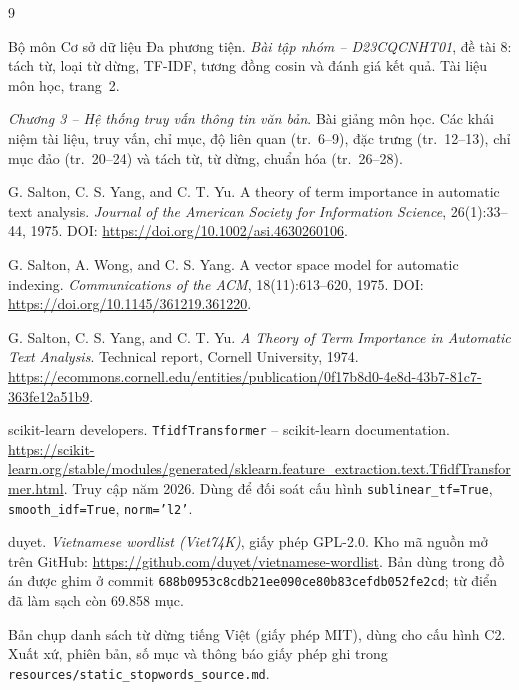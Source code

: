 \renewcommand{\bibname}{TÀI LIỆU THAM KHẢO}
\begin{thebibliography}{9}

Bộ môn Cơ sở dữ liệu Đa phương tiện.
\textit{Bài tập nhóm -- D23CQCNHT01}, đề tài 8: tách từ, loại từ dừng, TF-IDF,
tương đồng cosin và đánh giá kết quả. Tài liệu môn học, trang~2.

\textit{Chương 3 -- Hệ thống truy vấn thông tin văn bản}. Bài giảng môn học.
Các khái niệm tài liệu, truy vấn, chỉ mục, độ liên quan (tr.~6--9), đặc trưng
(tr.~12--13), chỉ mục đảo (tr.~20--24) và tách từ, từ dừng, chuẩn hóa (tr.~26--28).

G. Salton, C. S. Yang, and C. T. Yu.
\newblock A theory of term importance in automatic text analysis.
\newblock \textit{Journal of the American Society for Information Science},
26(1):33--44, 1975.
\newblock DOI: \url{https://doi.org/10.1002/asi.4630260106}.

G. Salton, A. Wong, and C. S. Yang.
\newblock A vector space model for automatic indexing.
\newblock \textit{Communications of the ACM}, 18(11):613--620, 1975.
\newblock DOI: \url{https://doi.org/10.1145/361219.361220}.

G. Salton, C. S. Yang, and C. T. Yu.
\newblock \textit{A Theory of Term Importance in Automatic Text Analysis}.
\newblock Technical report, Cornell University, 1974.
\newblock \url{https://ecommons.cornell.edu/entities/publication/0f17b8d0-4e8d-43b7-81c7-363fe12a51b9}.

scikit-learn developers.
\newblock \texttt{TfidfTransformer} -- scikit-learn documentation.
\newblock \url{https://scikit-learn.org/stable/modules/generated/sklearn.feature_extraction.text.TfidfTransformer.html}.
\newblock Truy cập năm 2026. Dùng để đối soát cấu hình
\texttt{sublinear\_tf=True}, \texttt{smooth\_idf=True}, \texttt{norm='l2'}.

duyet.
\newblock \textit{Vietnamese wordlist (Viet74K)}, giấy phép GPL-2.0.
\newblock Kho mã nguồn mở trên GitHub:
\url{https://github.com/duyet/vietnamese-wordlist}.
\newblock Bản dùng trong đồ án được ghim ở commit
\texttt{688b0953c8cdb21ee090ce80b83cefdb052fe2cd}; từ điển đã làm sạch còn 69.858
mục.

Bản chụp danh sách từ dừng tiếng Việt (giấy phép MIT), dùng cho cấu hình C2.
\newblock Xuất xứ, phiên bản, số mục và thông báo giấy phép ghi trong
\texttt{resources/static\_stopwords\_source.md}.

\end{thebibliography}

